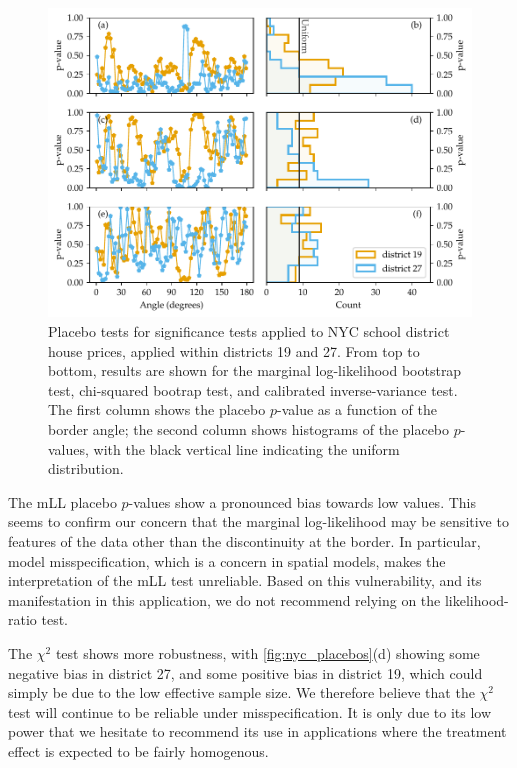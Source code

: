 \begin{figure}[tbp]
    \centering
    \includegraphics[width=\textwidth]{figures/NYC_placebos.pdf}
    \caption{
		\label{fig:nyc_placebos}
		Placebo tests for significance tests applied to NYC school district house prices, applied within districts 19 and 27. From top to bottom, results are shown for the marginal log-likelihood bootstrap test, chi-squared bootrap test, and calibrated inverse-variance test. The first column shows the placebo \(p\)-value as a function of the border angle; the second column shows histograms of the placebo \(p\)-values, with the black vertical line indicating the uniform distribution.
	}
\end{figure}

	The mLL placebo \(p\)-values show a pronounced bias towards low values.
This seems to confirm our concern that the marginal log-likelihood may be sensitive to features of the data other than the discontinuity at the border.
In particular, model misspecification, which is a concern in spatial models, makes the interpretation of the mLL test unreliable.
Based on this vulnerability, and its manifestation in this application, we do not recommend relying on the likelihood-ratio test.

	The \(\chi^2\) test shows more robustness, with \autoref{fig:nyc_placebos}(d) showing some negative bias in district 27, and some positive bias in district 19, which could simply be due to the low effective sample size.
We therefore believe that the \(\chi^2\) test will continue to be reliable under misspecification.
It is only due to its low power that we hesitate to recommend its use in applications where the treatment effect is expected to be fairly homogenous.

